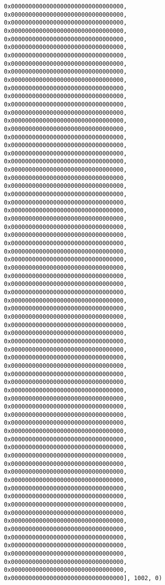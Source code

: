 \documentclass[11pt]{article}
\begin{document}
\begin{verbatim}
0x00000000000000000000000000000000, 0x00000000000000000000000000000000, 0x00000000000000000000000000000000, 0x00000000000000000000000000000000, 0x00000000000000000000000000000000, 0x00000000000000000000000000000000, 0x00000000000000000000000000000000, 0x00000000000000000000000000000000, 0x00000000000000000000000000000000, 0x00000000000000000000000000000000, 0x00000000000000000000000000000000, 0x00000000000000000000000000000000, 0x00000000000000000000000000000000, 0x00000000000000000000000000000000, 0x00000000000000000000000000000000, 0x00000000000000000000000000000000, 0x00000000000000000000000000000000, 0x00000000000000000000000000000000, 0x00000000000000000000000000000000, 0x00000000000000000000000000000000, 0x00000000000000000000000000000000, 0x00000000000000000000000000000000, 0x00000000000000000000000000000000, 0x00000000000000000000000000000000, 0x00000000000000000000000000000000, 0x00000000000000000000000000000000, 0x00000000000000000000000000000000, 0x00000000000000000000000000000000, 0x00000000000000000000000000000000, 0x00000000000000000000000000000000, 0x00000000000000000000000000000000, 0x00000000000000000000000000000000, 0x00000000000000000000000000000000, 0x00000000000000000000000000000000, 0x00000000000000000000000000000000, 0x00000000000000000000000000000000, 0x00000000000000000000000000000000, 0x00000000000000000000000000000000, 0x00000000000000000000000000000000, 0x00000000000000000000000000000000, 0x00000000000000000000000000000000, 0x00000000000000000000000000000000, 0x00000000000000000000000000000000, 0x00000000000000000000000000000000, 0x00000000000000000000000000000000, 0x00000000000000000000000000000000, 0x00000000000000000000000000000000, 0x00000000000000000000000000000000, 0x00000000000000000000000000000000, 0x00000000000000000000000000000000, 0x00000000000000000000000000000000, 0x00000000000000000000000000000000, 0x00000000000000000000000000000000, 0x00000000000000000000000000000000, 0x00000000000000000000000000000000, 0x00000000000000000000000000000000, 0x00000000000000000000000000000000, 0x00000000000000000000000000000000, 0x00000000000000000000000000000000, 0x00000000000000000000000000000000, 0x00000000000000000000000000000000, 0x00000000000000000000000000000000, 0x00000000000000000000000000000000, 0x00000000000000000000000000000000, 0x00000000000000000000000000000000, 0x00000000000000000000000000000000, 0x00000000000000000000000000000000, 0x00000000000000000000000000000000, 0x00000000000000000000000000000000, 0x00000000000000000000000000000000, 0x00000000000000000000000000000000], 1002, 0)
\end{verbatim}
\end{document}
